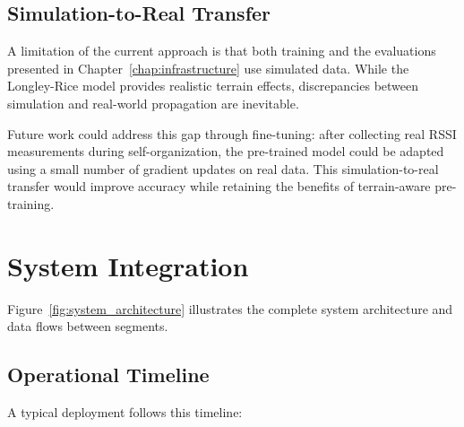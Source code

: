 \documentclass[master,final,11pt]{iscs-thesis}
\begin{document}
\subsection{Simulation-to-Real Transfer}

A limitation of the current approach is that both training and the evaluations presented in Chapter~\ref{chap:infrastructure} use simulated data.
While the Longley-Rice model provides realistic terrain effects, discrepancies between simulation and real-world propagation are inevitable.

Future work could address this gap through fine-tuning: after collecting real RSSI measurements during self-organization, the pre-trained model could be adapted using a small number of gradient updates on real data.
This simulation-to-real transfer would improve accuracy while retaining the benefits of terrain-aware pre-training.

\section{System Integration}
\label{sec:system_integration}

Figure~\ref{fig:system_architecture} illustrates the complete system architecture and data flows between segments.

\subsection{Operational Timeline}

A typical deployment follows this timeline:
\end{document}
